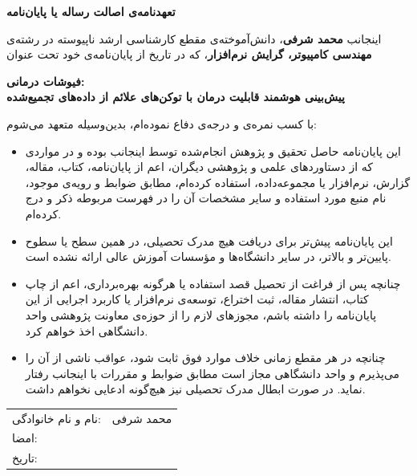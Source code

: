 \thispagestyle{empty}
\begin{center}
\vspace*{1.0cm}
{\Large\bfseries تعهدنامه‌ی اصالت رساله یا پایان‌نامه}
\end{center}

\vspace{1.0cm}
\noindent
اینجانب \textbf{محمد شرفی}، دانش‌آموخته‌ی مقطع کارشناسی ارشد ناپیوسته در رشته‌ی
\textbf{مهندسی کامپیوتر، گرایش نرم‌افزار}، که در تاریخ \dotfill از پایان‌نامه‌ی خود تحت عنوان

\begin{center}
\vspace{0.4cm}
\begin{minipage}{0.86\textwidth}
\centering\bfseries
فیوشات درمانی:\\
پیش‌بینی هوشمند قابلیت درمان با توکن‌های علائم از داده‌های تجمیع‌شده
\end{minipage}
\vspace{0.4cm}
\end{center}

\noindent
با کسب نمره‌ی \dotfill و درجه‌ی \dotfill دفاع نموده‌ام، بدین‌وسیله متعهد می‌شوم:

\begin{itemize}
\item این پایان‌نامه حاصل تحقیق و پژوهش انجام‌شده توسط اینجانب بوده و در مواردی که از دستاوردهای علمی و پژوهشی دیگران، اعم از پایان‌نامه، کتاب، مقاله، گزارش، نرم‌افزار یا مجموعه‌داده، استفاده کرده‌ام، مطابق ضوابط و رویه‌ی موجود، نام منبع مورد استفاده و سایر مشخصات آن را در فهرست مربوطه ذکر و درج کرده‌ام.
\item این پایان‌نامه پیش‌تر برای دریافت هیچ مدرک تحصیلی، در همین سطح یا سطوح پایین‌تر و بالاتر، در سایر دانشگاه‌ها و مؤسسات آموزش عالی ارائه نشده است.
\item چنانچه پس از فراغت از تحصیل قصد استفاده یا هرگونه بهره‌برداری، اعم از چاپ کتاب، انتشار مقاله، ثبت اختراع، توسعه‌ی نرم‌افزار یا کاربرد اجرایی از این پایان‌نامه را داشته باشم، مجوزهای لازم را از حوزه‌ی معاونت پژوهشی واحد دانشگاهی اخذ خواهم کرد.
\item چنانچه در هر مقطع زمانی خلاف موارد فوق ثابت شود، عواقب ناشی از آن را می‌پذیرم و واحد دانشگاهی مجاز است مطابق ضوابط و مقررات با اینجانب رفتار نماید. در صورت ابطال مدرک تحصیلی نیز هیچ‌گونه ادعایی نخواهم داشت.
\end{itemize}

\vfill
\noindent
\begin{tabular}{@{}p{}p{}@{}}
نام و نام خانوادگی: & محمد شرفی \\
امضا: & \dotfill \\
تاریخ: & \dotfill \\
\end{tabular}

\cleardoublepage
